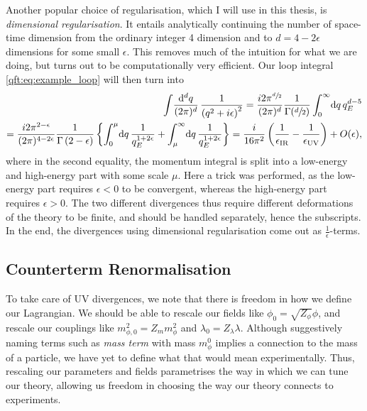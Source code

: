 \documentclass[../main.tex]{subfiles}
\begin{document}
Another popular choice of regularisation, which I will use in this thesis, is
\emph{dimensional regularisation}. It entails analytically continuing the
number of space-time dimension from the ordinary integer 4 dimension and to \(d
= 4-2\epsilon\) dimensions for some small \(\epsilon\). This removes much of
the intuition for what we are doing, but turns out to be computationally very
efficient. Our loop integral \cref{qft:eq:example_loop} will then turn into
\begin{align}
    \nonumber
    \loopintegral[d]{q} \frac{1}{\pclosed{q^2+i\epsilon}^2} = \frac{i
        2\pi^{\sfrac{d}{2}}}{(2\pi)^d} \frac{1}{\Gamma(\sfrac{d}{2})}
    \integral[_0^\infty]{q} q_E^{d-5} \\
    = \frac{i 2\pi^{2-\epsilon}}{(2\pi)^{4-2\epsilon}}
    \frac{1}{\Gamma\pclosed{2-\epsilon}} \cclosed{ \integral[_0^\mu]{q}
    \frac{1}{q_E^{1+2\epsilon}} + \integral[_\mu^\infty]{q}
    \frac{1}{q_E^{1+2\epsilon}} } = \frac{i}{16\pi^2}
    \pclosed{\frac{1}{\epsilon_\text{IR}} - \frac{1}{\epsilon_\text{UV}}} +
    O(\epsilon),
\end{align}
where in the second equality, the momentum integral is split into a low-energy
and high-energy part with some scale \(\mu\). Here a trick was performed, as
the low-energy part requires \(\epsilon < 0\) to be convergent, whereas the
high-energy part requires \(\epsilon>0\). The two different divergences thus
require different deformations of the theory to be finite, and should be
handled separately, hence the subscripts. In the end, the divergences using
dimensional regularisation come out as \(\frac{1}{\epsilon}\)-terms.

\subsection{Counterterm Renormalisation}
To take care of UV divergences, we note that there is freedom in how we define
our Lagrangian. We should be able to rescale our fields like \(\phi_0 =
\sqrt{Z_\phi} \phi\), and rescale our couplings like \(m_{\phi,0}^2 = Z_m
m_\phi^2\) and \(\lambda_0 = Z_\lambda \lambda\). Although suggestively naming
terms such as \emph{mass term} with mass \(m_\phi^0\) implies a connection to
the mass of a particle, we have yet to define what that would mean
experimentally. Thus, rescaling our parameters and fields parametrises the way
in which we can tune our theory, allowing us freedom in choosing the way our
theory connects to experiments.
\end{document}
